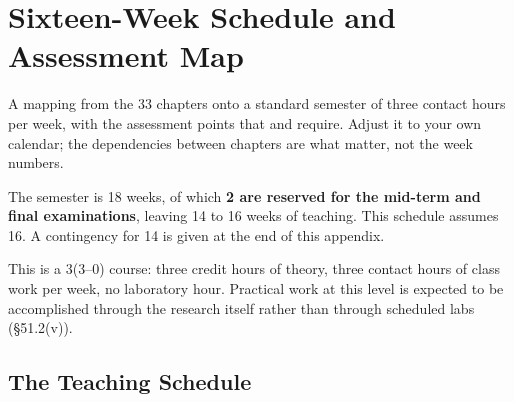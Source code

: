 \chapter{Sixteen-Week Schedule and Assessment Map}\label{app:schedule}

A mapping from the 33 chapters onto a standard semester of three contact hours
per week, with the assessment points that  and
 require. Adjust it to your own calendar; the
dependencies between chapters are what matter, not the week numbers.

\begin{regbox}
The semester is 18 weeks, of which \textbf{2 are reserved for the mid-term and
final examinations}, leaving 14 to 16 weeks of teaching. This schedule assumes
16. A contingency for 14 is given at the end of this appendix.

\medskip
This is a 3(3--0) course: three credit hours of theory, three contact hours of
class work per week, no laboratory hour. Practical work at this level is
expected to be accomplished through the research itself rather than through
scheduled labs (\S51.2(v)).
\end{regbox}

\section{The Teaching Schedule}


